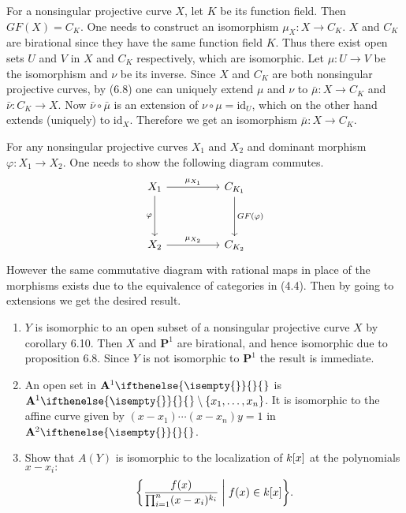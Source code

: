 \documentclass{note}
\newcommand{\Affine}[2][]{\mathbf{A}^{#2}\ifthenelse{\isempty{#1}}{}{_{#1}}}
\newcommand{\Proj}[1]{\mathbf{P}^{#1}}
\newcommand{\id}{\mathrm{id}}
\begin{document}
For a nonsingular projective curve $X$, let $K$ be its function field. Then
$GF(X) = C_K$. One needs to construct an isomorphism $\mu_X\colon X\to C_K$.
$X$ and $C_K$ are birational since they have the same function field $K$. Thus
there exist open sets $U$ and $V$ in $X$ and $C_K$ respectively, which are
isomorphic. Let $\mu\colon U\to V$ be the isomorphism and $\nu$ be its inverse.
Since $X$ and $C_K$ are both nonsingular projective curves, by (6.8) one can
uniquely extend $\mu$ and $\nu$ to $\bar\mu\colon X\to C_K$ and $\bar\nu\colon
  C_K\to X$. Now $\bar\nu\circ\bar\mu$ is an extension of $\nu\circ\mu = \id_U$,
which on the other hand extends (uniquely) to $\id_X$. Therefore we get an
isomorphism $\bar\mu\colon X\to C_K$.

For any nonsingular projective curves $X_1$ and $X_2$ and dominant morphism
$\varphi\colon X_1\to X_2$. One needs to show the following diagram commutes.
\begin{equation*}
  \begin{tikzcd}[row sep=huge,column sep=huge]
    X_1 \arrow{r}{\mu_{X_1}} \arrow[swap]{d}{\varphi} & C_{K_1}
    \arrow{d}{GF(\varphi)} \\ X_2 \arrow{r}{\mu_{X_2}} & C_{K_2}
  \end{tikzcd}
\end{equation*}
However the same commutative diagram with rational maps in place of the
morphisms exists due to the equivalence of categories in (4.4). Then by going
to extensions we get the desired result.


\Ex
\begin{enumerate}
  \item $Y$ is isomorphic to an open subset of a nonsingular projective
        curve $X$ by corollary 6.10. Then $X$ and $\Proj1$ are birational, and hence
        isomorphic due to proposition 6.8. Since $Y$ is not isomorphic to $\Proj1$ the
        result is immediate.
  \item An open set in $\Affine1$ is
        $\Affine1\setminus\set{x_1}{\dots}{x_n}$. It is isomorphic to the affine curve
        given by $(x-x_1)\cdots(x-x_n)y=1$ in $\Affine2$.
  \item Show that $A(Y)$ is
        isomorphic to the localization of $\polynomials{k}{x}$ at the polynomials
        $x-x_i\colon$
        \begin{equation*}
          \set{\frac{f(x)}{\prod_{i=1}^n(x-x_i)^{k_i}} \biggm\vert
            f(x) \in \polynomials{k}{x}}.
        \end{equation*}
\end{enumerate}
\end{document}
